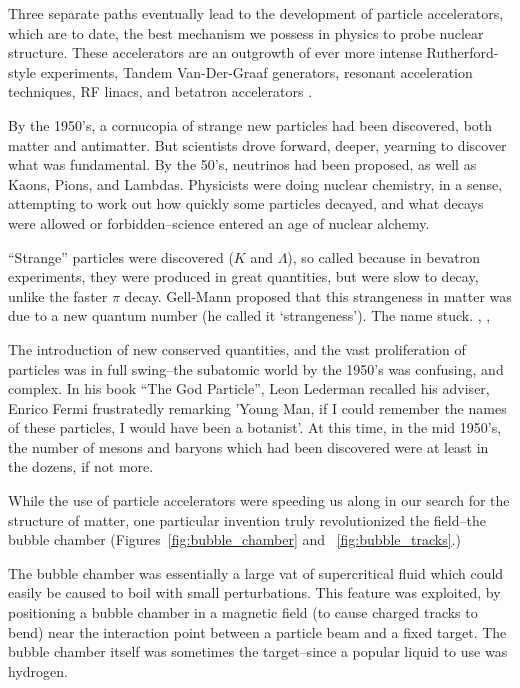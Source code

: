 Three separate paths eventually lead to the development of particle
accelerators, which are to date, the best mechanism we possess in physics to
probe nuclear structure. These accelerators are an outgrowth
of ever more intense Rutherford-style experiments, Tandem Van-Der-Graaf
generators, resonant acceleration techniques, RF linacs, and betatron
accelerators \cite{Bryant1994}.

By the 1950's, a cornucopia of strange new particles had been discovered, both
matter and antimatter. But scientists drove forward, deeper, yearning to
discover what was fundamental. By the 50's, neutrinos had been proposed, as well
as Kaons, Pions, and Lambdas. Physicists were doing nuclear chemistry, in a
sense, attempting to work out how quickly some particles decayed, and what
decays were allowed or forbidden--science entered an age of nuclear alchemy.

``Strange'' particles were discovered ($K$ and $\Lambda$), so called because in
bevatron experiments, they were produced in great quantities, but were slow to
decay, unlike the faster $\pi$ decay. Gell-Mann proposed that this strangeness
in matter was due to a new quantum number (he called it `strangeness'). The name
stuck.
 \cite{Gell-Mann1953}, \cite{Gell-Mann1956}, \cite{Krauss2015}

The introduction of new conserved quantities, and the vast proliferation of
particles was in full swing--the subatomic world by the 1950's was confusing,
and complex. In his book ``The God Particle'', Leon Lederman recalled his adviser,
Enrico Fermi frustratedly remarking 'Young Man, if I could remember the names of
these particles, I would have been a botanist'. At this time, in the mid 1950's,
the number of mesons and baryons which had been discovered were at least in the
dozens, if not more.

While the use of particle accelerators were speeding us along in  our search for
the structure of matter, one particular invention truly revolutionized the
field--the bubble chamber (Figures~\ref{fig:bubble_chamber} and
~\ref{fig:bubble_tracks}.)

The bubble chamber was essentially a large vat of supercritical fluid which
could easily be caused to boil with small perturbations. This feature was
exploited, by positioning a bubble chamber in a magnetic field (to cause charged
tracks to bend) near the interaction point between a particle beam and a fixed
target. The bubble chamber itself was sometimes the target--since a popular
liquid to use was hydrogen. 

